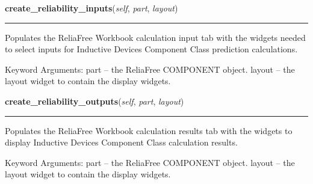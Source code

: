 \hspace{.8\funcindent}\begin{boxedminipage}{\funcwidth}

    \raggedright \textbf{create\_reliability\_inputs}(\textit{self}, \textit{part}, \textit{layout})

    \vspace{-1.5ex}

    \rule{\textwidth}{0.5\fboxrule}
\setlength{\parskip}{2ex}
    Populates the ReliaFree Workbook calculation input tab with the widgets
    needed to select inputs for Inductive Devices Component Class 
    prediction calculations.

    Keyword Arguments: part   -- the ReliaFree COMPONENT object. layout -- 
    the layout widget to contain the display widgets.

\setlength{\parskip}{1ex}
    \end{boxedminipage}

    \label{reliafree:inductors:inductor:Inductor:create_reliability_outputs}

    \vspace{0.5ex}

\hspace{.8\funcindent}\begin{boxedminipage}{\funcwidth}

    \raggedright \textbf{create\_reliability\_outputs}(\textit{self}, \textit{part}, \textit{layout})

    \vspace{-1.5ex}

    \rule{\textwidth}{0.5\fboxrule}
\setlength{\parskip}{2ex}
    Populates the ReliaFree Workbook calculation results tab with the 
    widgets to display Inductive Devices Component Class calculation 
    results.

    Keyword Arguments: part   -- the ReliaFree COMPONENT object. layout -- 
    the layout widget to contain the display widgets.

\setlength{\parskip}{1ex}
    \end{boxedminipage}

    \label{reliafree:inductors:inductor:Inductor:entry_callback}

